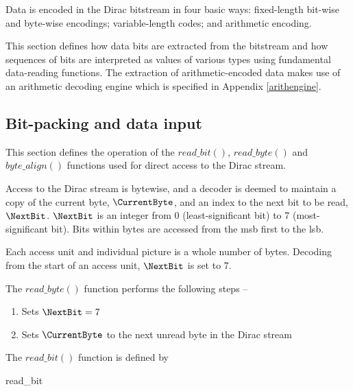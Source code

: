 
\label{dataenc}

Data is encoded in the Dirac bitstream in four basic ways: fixed-length
bit-wise and byte-wise encodings; variable-length codes; and arithmetic encoding.

This section defines how data bits are extracted from the bitstream and how
sequences of bits are interpreted as values of various types using fundamental
data-reading functions. The extraction of arithmetic-encoded data makes use of
an arithmetic decoding engine which is specified in Appendix \ref{arithengine}.

\subsection{Bit-packing and data input}
\label{bitpacking}

This section defines the operation of the $read\_bit()$, $read\_byte()$ 
and $byte\_align()$ functions used for direct access to the Dirac stream.

Access to the Dirac stream is bytewise, and a decoder is deemed to maintain
a copy of the current byte, $\CurrentByte$, and an index to the next bit
to be read, $\NextBit$. $\NextBit$ is an integer from 0 (least-significant bit) to 7 
(most-significant bit). Bits within bytes are accessed from the msb first to the
lsb.

Each access unit and individual picture is a whole number of bytes. Decoding from the
start of an access unit, $\NextBit$ is set to 7.

The $read\_byte()$ function performs the following steps --
\begin{enumerate}
\item Sets $\NextBit=7$ 
\item Sets $\CurrentByte$ to the next unread byte in the Dirac stream
\end{enumerate}

The $read\_bit()$ function is defined by

\begin{pseudo}{read\_bit}{}
\bsEND
{}
\end{pseudo}

